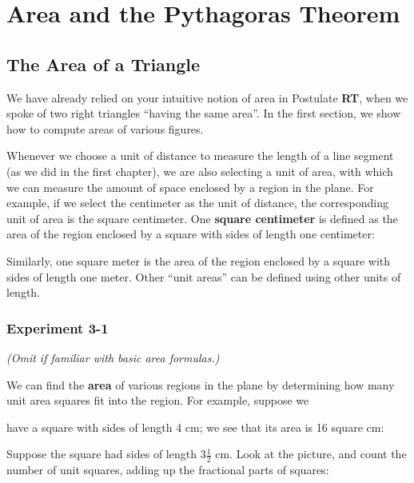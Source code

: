 \documentclass[12pt]{book} %
\begin{document}
\chapter{Area and the Pythagoras Theorem}

\section{The Area of a Triangle}

We have already relied on your intuitive notion of area in Postulate \textbf{RT}, when we spoke of two right triangles ``having the same area''. In the first section, we show how to compute areas of various figures.

Whenever we choose a unit of distance to measure the length of a line segment (as we did in the first chapter), we are also selecting a unit of area, with which we can measure the amount of space enclosed by a region in the plane. For example, if we select the centimeter as the unit of distance, the corresponding unit of area is the square centimeter. One \textbf{square centimeter} is defined as the area of the region enclosed by a square with sides of length one centimeter:

\begin{center}
\end{center}

Similarly, one square meter is the area of the region enclosed by a square with sides of length one meter. Other ``unit areas'' can be defined using other units of length.

\subsection*{Experiment 3-1}
\textit{(Omit if familiar with basic area formulas.)}

We can find the \textbf{area} of various regions in the plane by determining how many unit area squares fit into the region. For example, suppose we

have a square with sides of length 4 cm; we see that its area is 16 square cm:


Suppose the square had sides of length $3\frac{1}{2}$ cm. Look at the picture, and count the number of unit squares, adding up the fractional parts of squares:

\end{document}
